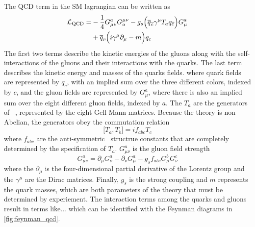 The QCD term in the SM lagrangian can be written as
\begin{equation}
\begin{aligned}
\mathcal{L}_{\textrm{QCD}} = &-\frac{1}{4}G^a_{\mu\nu} G_a^{\mu\nu} 
                         -g_s \Big( \overline{q}_{\overline{c}} \gamma^{\mu} T_a q_{\overline{c}} \Big) G_{\mu}^a \\
			 &+\overline{q}_{\overline{c}}\Big( i\gamma^{\mu} \partial_{\mu} - m\Big) q_c
\end{aligned}
\label{eq:lagrangian_qcd}
\end{equation}
The first two terms describe the kinetic energies of the gluons
along with the self-interactions of the gluons and their interactions
with the quarks. The last term describes the
kinetic energy and masses of the quarks fields.
where quark fields are represented by $q_c$, with an implied sum over the
three different colors, indexed by $c$, and the gluon fields are represented
by $G_{\mu}^a$, where there is also an implied sum over the eight
different gluon fields, indexed by $a$. The 
$T_a$ are the generators of \suthree~, represented by the eight Gell-Mann matrices.
Because the theory is non-Abelian, the generators obey the commutation relation
\begin{equation}
\Big[T_a,T_b\Big] = i f_{abc} T_c
\end{equation}
where $f_{abc}$ are the anti-symmetric
\suthree~structrue constants that are completely determined
by the specification of $T_a$.
$G_{\mu\nu}^a$ is the gluon field strength
\begin{equation}
G_{\mu\nu}^a = \partial_{\mu} G^a_{\nu} - \partial_{\nu} G^a_{\mu} - g_s f_{abc} G_{\mu}^b G_{\nu}^c
\end{equation}
where the $\partial_{\mu}$ is the four-dimensional partial derivative 
of the Lorentz
group and the $\gamma^{\mu}$ are the Dirac matrices.
Finally, $g_s$ is the strong coupling and $m$ represents
the quark masses, which are both parameters of the theory that must
be determined by experiement.
The interaction terms among the quarks and gluons result in terms
like...
which can be identified with the Feynman diagrams in \fig\ref{fig:feynman_qcd}.



